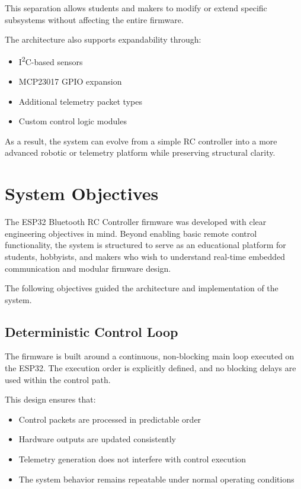 This separation allows students and makers to modify or extend specific subsystems without affecting the entire firmware.

The architecture also supports expandability through:

\begin{itemize}
	\item I\textsuperscript{2}C-based sensors
	\item MCP23017 GPIO expansion
	\item Additional telemetry packet types
	\item Custom control logic modules
\end{itemize}

As a result, the system can evolve from a simple RC controller into a more advanced robotic or telemetry platform while preserving structural clarity.







\section{System Objectives}

The ESP32 Bluetooth RC Controller firmware was developed with clear engineering objectives in mind. Beyond enabling basic remote control functionality, the system is structured to serve as an educational platform for students, hobbyists, and makers who wish to understand real-time embedded communication and modular firmware design.

The following objectives guided the architecture and implementation of the system.

\subsection{Deterministic Control Loop}

The firmware is built around a continuous, non-blocking main loop executed on the ESP32. The execution order is explicitly defined, and no blocking delays are used within the control path.

This design ensures that:

\begin{itemize}
	\item Control packets are processed in predictable order
	\item Hardware outputs are updated consistently
	\item Telemetry generation does not interfere with control execution
	\item The system behavior remains repeatable under normal operating conditions
\end{itemize}


